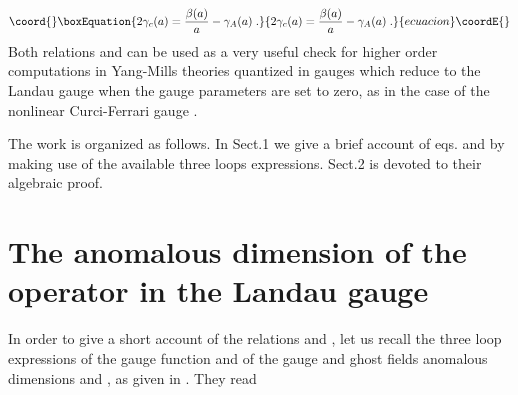 \documentclass[a4paper,12pt]{article}
\begin{document}
\begin{equation}\coord{}\boxEquation{
2\gamma _{c}(a)=\frac{\beta (a)}{a}-\gamma _{A}(a)\;.  \label{ri1}
}{
2\gamma _{c}(a)=\frac{\beta (a)}{a}-\gamma _{A}(a)\;.  }{ecuacion}\coordE{}\end{equation}
Both relations \myHighlight{$\left( \ref{ri}\right) $}\coordHE{} and \myHighlight{$\left( \ref{ri1}\right) $}\coordHE{} can
be used as a very useful check for higher order computations in Yang-Mills
theories quantized in gauges which reduce to the Landau gauge when the gauge
parameters are set to zero, as in the case of the nonlinear Curci-Ferrari
gauge \cite{gr}.

The work is organized as follows. In Sect.1 we give a brief account of eqs.\myHighlight{$%
\left( \ref{ri}\right) $}\coordHE{} and \myHighlight{$\left( \ref{ri1}\right) $}\coordHE{} by making use of the
available three loops expressions. Sect.2 is devoted to their algebraic
proof.

\section{The anomalous dimension of the operator \coordHE{}in the Landau gauge
}

In order to give a short account of the relations \myHighlight{$\left( \ref{ri}\right) $}\coordHE{}
and \myHighlight{$\left( \ref{ri1}\right) $}\coordHE{}, let us recall the three loop expressions of
the gauge \myHighlight{$\beta $}\coordHE{} function and of the gauge and ghost fields anomalous
dimensions \coordHE{} and \coordHE{}, as given in \cite{gr}. They read
\end{document}
